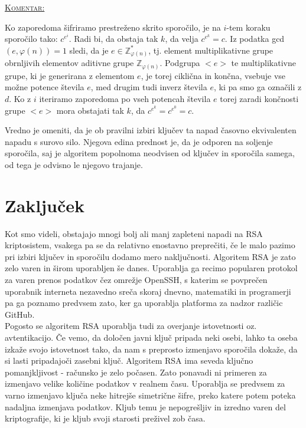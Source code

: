 \documentclass[a4paper, 12pt]{article} %
\newenvironment{matematika}[1]{
\textcolor{bostonuniversityred}{\underline{\textsc{#1:}}}
}{
}
\begin{document}
\begin{matematika}{Komentar}
Ko zaporedoma šifriramo prestreženo skrito sporočilo, je na $i$-tem koraku sporočilo tako: $c^{e^{i}}$. Radi bi, da obstaja tak $k$, da velja $c^{e^k} = c$.
\newline
Iz podatka gcd$(e, \varphi (n)) = 1$ sledi, da je $e \in \mathbb{Z}_{\varphi (n)}^{*}$, tj. element multiplikativne grupe obrnljivih elementov aditivne grupe $\mathbb{Z}_{\varphi (n)}$. Podgrupa $<e>$ te multiplikativne grupe, ki je generirana z elementom $e$, je torej ciklična in končna, vsebuje vse možne potence števila $e$, med drugim tudi inverz števila $e$, ki pa smo ga označili z $d$. Ko z $i$ iteriramo zaporedoma po vseh potencah števila $e$ torej zaradi končnosti grupe $<e>$ mora obstajati tak $k$, da $c^{e^k} = c^{e^0} = c$. \\
\end{matematika}

Vredno je omeniti, da je ob pravilni izbiri ključev ta napad časovno ekvivalenten napadu s surovo silo. Njegova edina prednost je, da je odporen na soljenje sporočila, saj je algoritem popolnoma neodvisen od ključev in sporočila samega, od tega je odvisno le njegovo trajanje.

\newpage
\section{Zaključek}

Kot smo videli, obstajajo mnogi bolj ali manj zapleteni napadi na RSA kriptosistem, vsakega pa se da relativno enostavno preprečiti, če le malo pazimo pri izbiri ključev in sporočilu dodamo mero naključnosti. Algoritem RSA je zato zelo varen in širom uporabljen še danes. Uporablja ga recimo popularen protokol za varen prenos podatkov čez omrežje OpenSSH, s katerim se povprečen uporabnik interneta nezavedno sreča skoraj dnevno, matematiki in programerji pa ga poznamo predvsem zato, ker ga uporablja platforma za nadzor različic GitHub.\\
Pogosto se algoritem RSA uporablja tudi za overjanje istovetnosti oz. avtentikacijo. Če vemo, da določen javni ključ pripada neki osebi, lahko ta oseba izkaže svojo istovetnost tako, da nam s preprosto izmenjavo sporočila dokaže, da si lasti pripadajoči zasebni ključ.
\newline
\newline
Algoritem RSA ima seveda ključno pomanjkljivost - računsko je zelo počasen. Zato ponavadi ni primeren za izmenjavo velike količine podatkov v realnem času. Uporablja se predvsem za varno izmenjavo ključa neke hitrejše simetrične šifre, preko katere potem poteka nadaljna izmenjava podatkov. Kljub temu je nepogrešljiv in izredno varen del kriptografije, ki je kljub svoji starosti preživel zob časa.
\end{document}

